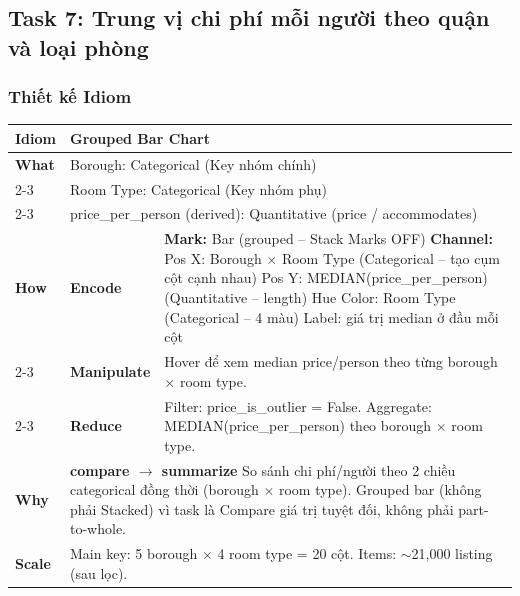 \subsection{Task 7: Trung vị chi phí mỗi người theo quận và loại phòng}

\subsubsection{Thiết kế Idiom}

\begin{table}[H]
\centering
\renewcommand{\arraystretch}{1.1}
\begin{tabularx}{\textwidth}{|l|l|X|}
\hline
\textbf{Idiom} & \multicolumn{2}{l|}{\textbf{Grouped Bar Chart}} \\ \hline
\textbf{What}
& \multicolumn{2}{X|}{Borough: Categorical (Key nhóm chính)} \\ \cline{2-3}
& \multicolumn{2}{X|}{Room Type: Categorical (Key nhóm phụ)} \\ \cline{2-3}
& \multicolumn{2}{X|}{price\_per\_person (derived): Quantitative (price / accommodates)} \\ \hline
\textbf{How}
& \textbf{Encode} &
\textbf{Mark:} Bar (grouped -- Stack Marks OFF) \newline
\textbf{Channel:} \newline
\hspace*{1em} Pos X: Borough $\times$ Room Type (Categorical -- tạo cụm cột cạnh nhau) \newline
\hspace*{1em} Pos Y: MEDIAN(price\_per\_person) (Quantitative -- length) \newline
\hspace*{1em} Hue Color: Room Type (Categorical -- 4 màu) \newline
\hspace*{1em} Label: giá trị median ở đầu mỗi cột \\ \cline{2-3}
& \textbf{Manipulate} &
Hover để xem median price/person theo từng borough $\times$ room type. \\ \cline{2-3}
& \textbf{Reduce} &
Filter: price\_is\_outlier = False. \newline
Aggregate: MEDIAN(price\_per\_person) theo borough $\times$ room type. \\ \hline
\textbf{Why} & \multicolumn{2}{X|}{
\textbf{compare $\rightarrow$ summarize} \newline
So sánh chi phí/người theo 2 chiều categorical đồng thời (borough $\times$ room type). Grouped bar (không phải Stacked) vì task là Compare giá trị tuyệt đối, không phải part-to-whole.
} \\ \hline
\textbf{Scale} & \multicolumn{2}{X|}{
Main key: 5 borough $\times$ 4 room type = 20 cột. \newline
Items: $\sim$21,000 listing (sau lọc).
} \\ \hline
\end{tabularx}
\end{table}

